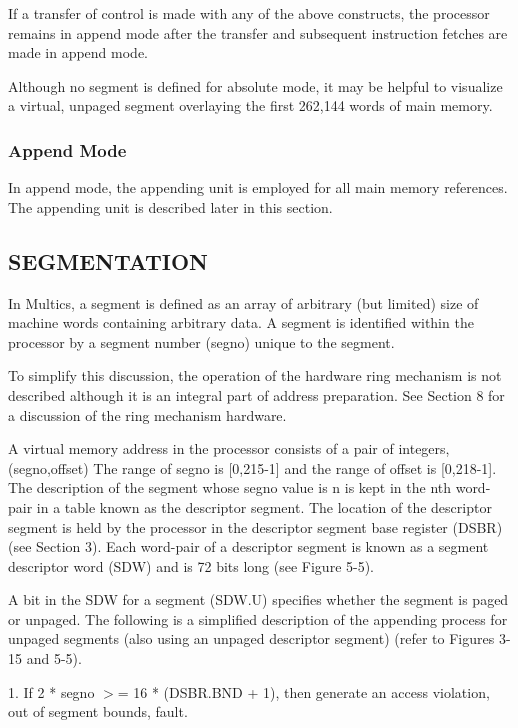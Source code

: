 If a transfer of control is made with any of the above constructs, the
processor remains in append mode after the transfer and subsequent instruction
fetches are made in append mode.


Although no segment is defined for absolute mode, it may be helpful to
visualize a virtual, unpaged segment overlaying the first 262,144 words of main
memory.



\subsubsection{Append Mode}

In append mode, the appending unit is employed for all main memory references.
The appending unit is described later in this section.  



\subsection{SEGMENTATION}

In Multics, a segment is defined as an array of arbitrary (but limited) size of
machine words containing arbitrary data. A segment is identified within the
processor by a segment number (segno) unique to the segment.


To simplify this discussion, the operation of the hardware ring mechanism is
not described although it is an integral part of address preparation. See
Section 8 for a discussion of the ring mechanism hardware.


A virtual memory address in the processor consists of a pair of integers,
(segno,offset) The range of segno is [0,215-1] and the range of offset is
[0,218-1]. The description of the segment whose segno value is n is kept in the
nth word-pair in a table known as the descriptor segment.  The location of the
descriptor segment is held by the processor in the descriptor segment base
register (DSBR) (see Section 3). Each word-pair of a descriptor segment is
known as a segment descriptor word (SDW) and is 72 bits long (see Figure 5-5).


A bit in the SDW for a segment (SDW.U) specifies whether the segment is paged
or unpaged. The following is a simplified description of the appending process
for unpaged segments (also using an unpaged descriptor segment) (refer to
Figures 3-15 and 5-5).


1. If 2 * segno $>$= 16 * (DSBR.BND + 1), then generate an access violation,
out of segment bounds, fault.


